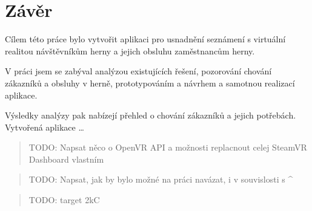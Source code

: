 \section{Závěr}\label{zuxe1vux11br}

Cílem této práce bylo vytvořit aplikaci pro usnadnění seznámení s
virtuální realitou návštěvníkům herny a jejich obsluhu zaměstnancům
herny.

V práci jsem se zabýval analýzou existujících řešení, pozorování chování
zákazníků a obsluhy v herně, prototypováním a návrhem a samotnou
realizací aplikace.

Výsledky analýzy pak nabízejí přehled o chování zákazníků a jejich
potřebách. Vytvořená aplikace \ldots{}

\begin{quote}
TODO: Napsat něco o OpenVR API a možnosti replacnout celej SteamVR
Dashboard vlastním
\end{quote}

\begin{quote}
TODO: Napsat, jak by bylo možné na práci navázat, i v souvislosti s \^{}
\end{quote}

\begin{quote}
TODO: target 2kC
\end{quote}

